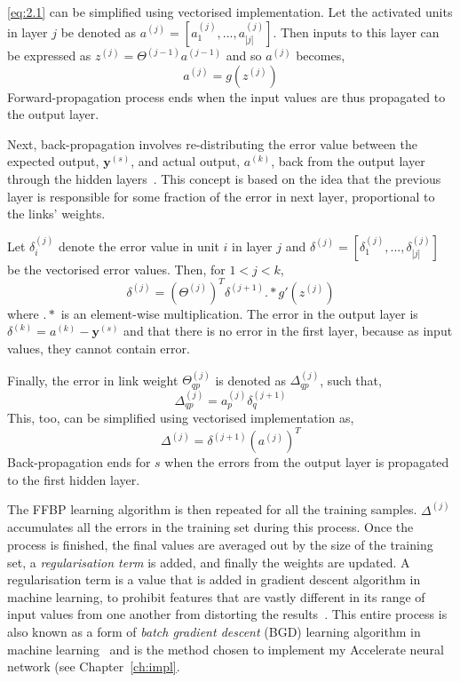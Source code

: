 \ref{eq:2.1} can be simplified using vectorised implementation. Let the activated units in layer $j$ be denoted as $a^{(j)} = [a_{1}^{(j)},...,a_{|j|}^{(j)}]$. Then inputs to this layer can be expressed as $z^{(j)} = \Theta^{(j-1)} a^{(j-1)}$ and so $a^{(j)}$ becomes,
\begin{equation}
a^{(j)} = g(z^{(j)}) \label{eq:2.2}
\end{equation}
Forward-propagation process ends when the input values are thus propagated to the output layer. 

Next, back-propagation involves re-distributing the error value between the expected output, $\boldsymbol{y}^{(s)}$, and actual output, $a^{(k)}$, back from the output layer through the hidden layers~\cite{RumHinWil86}. This concept is based on the idea that the previous layer is responsible for some fraction of the error in next layer, proportional to the links' weights. 

Let $\delta_i^{(j)}$ denote the error value in unit $i$ in layer $j$ and $\delta^{(j)} = [\delta_1^{(j)},...,\delta_{|j|}^{(j)}]$ be the vectorised error values. Then, for $1 < j < k$,
\begin{equation}
\delta^{(j)} = (\Theta^{(j)})^{T} \delta^{(j+1)} .\!* g'(z^{(j)})
\end{equation}
where $.\!*$ is an element-wise multiplication. The error in the output layer is $\delta^{(k)} = a^{(k)} - \boldsymbol{y}^{(s)}$ and that there is no error in the first layer, because as input values, they cannot contain error.

Finally, the error in link weight $\Theta_{qp}^{(j)}$ is denoted as $\Delta_{qp}^{(j)}$, such that,
$$\Delta_{qp}^{(j)}  = a_p^{(j)}\delta_q^{(j+1)}$$
This, too, can be simplified using vectorised implementation as,
\begin{equation}
\Delta^{(j)} = \delta^{(j+1)}(a^{(j)})^T \label{eq:2.3}
\end{equation}
Back-propagation ends for $s$ when the errors from the output layer is propagated to the first hidden layer.

The FFBP learning algorithm is then repeated for all the training samples. $\Delta^{(j)}$ accumulates all the errors in the training set during this process. Once the process is finished, the final values are averaged out by the size of the training set, a \textit{regularisation term} is added, and finally the weights are updated. A regularisation term is a value that is added in gradient descent algorithm in machine learning, to prohibit features that are vastly different in its range of input values from one another from distorting the results~\cite{Ng12}. This entire process is also known as a form of \textit{batch gradient descent} (BGD) learning algorithm in machine learning~\cite{Ng12} and is the method chosen to implement my Accelerate neural network (see Chapter~\ref{ch:impl}.

